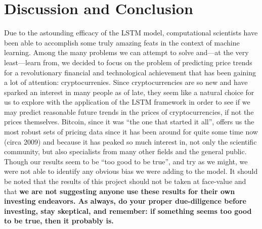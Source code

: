 \documentclass[conference]{IEEEtran}
\begin{document}
\section{Discussion and Conclusion}
Due to the astounding efficacy of the LSTM model, computational scientists have been able to
accomplish some truly amazing feats in the context of machine learning. Among the many problems
we can attempt to solve and---at the very least---learn from, we decided to focus on the problem
of predicting price trends for a revolutionary financial and technological achievement that has
been gaining a lot of attention: cryptocurrenies. Since cryptocurrencies are so new and have
sparked an interest in many people as of late, they seem like a natural choice for us to explore
with the application of the LSTM framework in order to see if we may predict reasonable future
trends in the prices of cryptocurrencies, if not the prices themselves. Bitcoin, since it was
``the one that started it all'', offers us the most robust sets of pricing data since it has
been around for quite some time now (circa 2009) and because it has peaked so much interest in,
not only the scientific community, but also specialists from many other fields and the general
public. Though our results seem to be ``too good to be true'', and try as we might, we were not
able to identify any obvious bias we were adding to the model. It should be noted that the
results of this project should not be taken at face-value and that \textbf{we are not suggesting
anyone use these results for their own investing endeavors. As always, do your proper
due-diligence before investing, stay skeptical, and remember: if something seems too good to be
true, then it probably is.}



                                                                                
\end{document}
